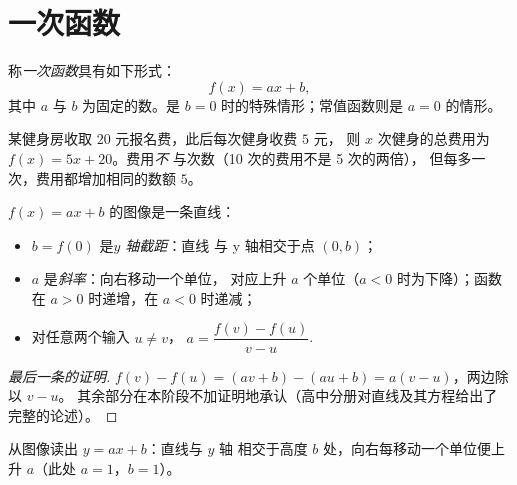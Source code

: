 \section{一次函数}

\begin{definition}[一次函数]\label{def:g9:linfunc:affine}
称\emph{一次函数}具有如下形式：
\[
f(x) = a x + b ,
\]
其中 $a$ 与 $b$ 为固定的数。是
$b = 0$ 时的特殊情形；常值函数则是 $a = 0$ 的情形。
\end{definition}

\begin{example}
某健身房收取 $20$ 元报名费，此后每次健身收费 $5$ 元，
则 $x$ 次健身的总费用为 $f(x) = 5x + 20$。费用\emph{不}
与次数（10 次的费用不是 5 次的两倍），
但每多一次，费用都增加相同的数额 $5$。
\end{example}

\begin{proposition}[一次函数的图像]\label{prop:g9:linfunc:affinegraph}
$f(x) = ax + b$ 的图像是一条直线：
\begin{itemize}
  \item $b = f(0)$ 是\emph{$y$ 轴截距}：直线
        与 y 轴相交于点 $(0, b)$；
  \item $a$ 是\emph{斜率}：向右移动一个单位，
        对应上升 $a$ 个单位（$a < 0$ 时为下降）；函数
        在 $a > 0$ 时递增，在 $a < 0$ 时递减；
  \item 对任意两个输入 $u \neq v$，
        $a = \dfrac{f(v) - f(u)}{v - u}$.
\end{itemize}
\end{proposition}

\begin{proof}[最后一条的证明]
$f(v) - f(u) = (av + b) - (au + b) = a(v - u)$，两边除以 $v - u$。
其余部分在本阶段不加证明地承认（高中分册对直线及其方程给出了
完整的论述）。
\end{proof}

\begin{omfigure}

{\small 从图像读出 $y = ax + b$：直线与 $y$ 轴
相交于高度 $b$ 处，向右每移动一个单位便上升 $a$（此处
$a = 1$，$b = 1$）。}
\end{omfigure}

